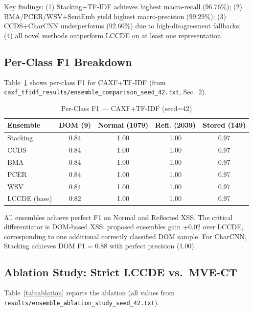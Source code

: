 \documentclass[conference]{IEEEtran}
\begin{document}
Key findings: (1) Stacking+TF-IDF achieves highest macro-recall (96.76\%);
(2) BMA/PCER/WSV+SentEmb yield highest macro-precision (99.29\%);
(3) CCDS+CharCNN underperforms (92.60\%) due to high-disagreement fallbacks;
(4) all novel methods outperform LCCDE on at least one representation.

\subsection{Per-Class F1 Breakdown}

Table~\ref{tab:perclass} shows per-class F1 for CAXF+TF-IDF
(from \texttt{caxf\_tfidf\_results/ensemble\_comparison\_seed\_42.txt}, Sec.~2).

\begin{table}[t]
\centering
\caption{Per-Class F1 --- CAXF+TF-IDF (seed=42)}
\label{tab:perclass}
\begin{tabular}{lcccc}
\toprule
\textbf{Ensemble} & \textbf{DOM (9)} & \textbf{Normal (1079)} &
  \textbf{Refl. (2039)} & \textbf{Stored (149)} \\
\midrule
Stacking       & 0.84 & 1.00 & 1.00 & 0.97 \\
CCDS           & 0.84 & 1.00 & 1.00 & 0.97 \\
BMA            & 0.84 & 1.00 & 1.00 & 0.97 \\
PCER           & 0.84 & 1.00 & 1.00 & 0.97 \\
WSV            & 0.84 & 1.00 & 1.00 & 0.97 \\
LCCDE (base)   & 0.82 & 1.00 & 1.00 & 0.97 \\
\bottomrule
\end{tabular}
\end{table}

All ensembles achieve perfect F1 on Normal and Reflected XSS. The critical
differentiator is DOM-based XSS: proposed ensembles gain +0.02 over LCCDE,
corresponding to one additional correctly classified DOM sample. For CharCNN,
Stacking achieves DOM F1 = 0.88 with perfect precision (1.00).

\subsection{Ablation Study: Strict LCCDE vs.\ MVE-CT}

Table~\ref{tab:ablation} reports the ablation (all values from
\texttt{results/ensemble\_ablation\_study\_seed\_42.txt}).
\end{document}
